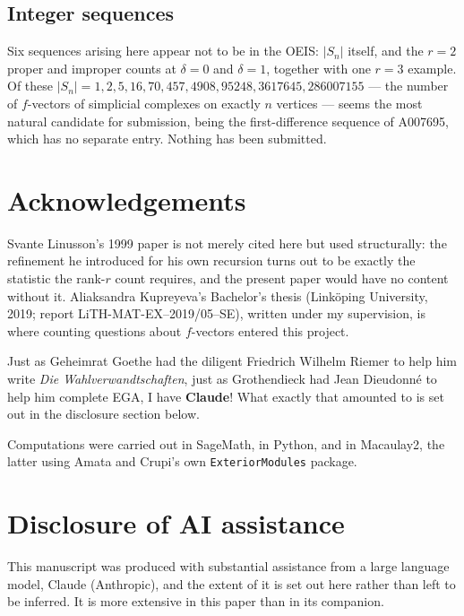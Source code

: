 \documentclass[11pt, a4paper, abstract=yes]{scrartcl}
\theoremstyle{definition}
\theoremstyle{remark}
\theoremstyle{plain}
\begin{document}
\subsection{Integer sequences}
\label{sec:orgb2286af}

Six sequences arising here appear not to be in the OEIS: \(|S_n|\) itself, and the \(r=2\)
proper and improper counts at \(\delta=0\) and \(\delta=1\), together with one \(r=3\) example. Of
these \(|S_n|=1,2,5,16,70,457,4908,95248,3617645,286007155\) --- the number of \(f\)-vectors of
simplicial complexes on exactly \(n\) vertices --- seems the most natural candidate for submission,
being the first-difference sequence of A007695, which has no separate entry. Nothing has been
submitted.
\section*{Acknowledgements}
\label{sec:org38cb087}
Svante Linusson's 1999 paper is not merely cited here but used structurally: the refinement he
introduced for his own recursion turns out to be exactly the statistic the rank-\(r\) count requires,
and the present paper would have no content without it. Aliaksandra Kupreyeva's Bachelor's thesis
(Linköping University, 2019; report LiTH-MAT-EX--2019/05--SE), written under my supervision, is where
counting questions about \(f\)-vectors entered this project.

Just as Geheimrat Goethe had the diligent Friedrich Wilhelm Riemer to help him write \emph{Die
Wahlverwandtschaften}, just as Grothendieck had Jean Dieudonné to help him complete EGA, I have
\textbf{Claude}! What exactly that amounted to is set out in the disclosure section below.

Computations were carried out in SageMath, in Python, and in Macaulay2, the latter using Amata and
Crupi's own \texttt{ExteriorModules} package.
\section*{Disclosure of AI assistance}
\label{sec:org89ecfb8}
This manuscript was produced with substantial assistance from a large language model, Claude
(Anthropic), and the extent of it is set out here rather than left to be inferred. It is more
extensive in this paper than in its companion.
\end{document}
